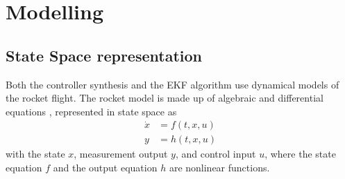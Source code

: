 \section{Modelling}
\subsection{State Space representation}
Both the controller synthesis and the EKF algorithm use dynamical models of the rocket flight. The rocket model is made up of algebraic and differential equations \cite{zipfel2007, stevens2015}, represented in state space as \cite{lewis2008, stevens2015}
\begin{align}
    \dot x &= f(t, x, u) \\  y &= h(t, x, u)
\end{align}  
with the state $x$, measurement output $y$, and control input $u$, where the state equation $f$ and the output equation $h$ are nonlinear functions.

